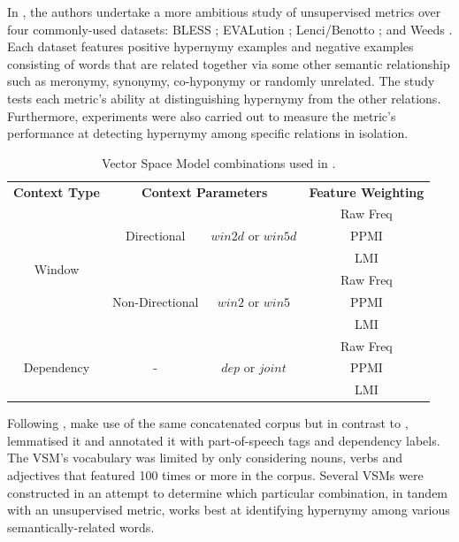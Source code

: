 In \citep{shwartz2017siege}, the authors undertake a more ambitious study of unsupervised metrics over four commonly-used datasets: BLESS \citep{Baroni2011}; EVALution \citep{santus2015evalution}; Lenci/Benotto \citep{benotto2015distributional}; and Weeds \citep{weeds2014learning}.  Each dataset features positive hypernymy examples and negative examples consisting of words that are related together via some other semantic relationship such as meronymy, synonymy, co-hyponymy or randomly unrelated.  The study tests each metric’s ability at distinguishing hypernymy from the other relations.  Furthermore, experiments were also carried out to measure the metric’s performance at detecting hypernymy among specific relations in isolation. 

\begin{table}\centering
    \begin{tabular}{@{}cccc@{}} \toprule
    \textbf{Context Type} & \multicolumn{2}{c}{\textbf{Context Parameters}} & \textbf{Feature Weighting} \\ \cmidrule{1-4}
    \multirow{6}{*}{Window} & 
    \multirow{3}{*}{Directional} &
    \multirow{3}{*}{$win2d$ or $win5d$} & Raw Freq \\
    & & & PPMI \\
    & & & LMI \\ 
    \cmidrule{2-4}
    & \multirow{3}{*}{Non-Directional} &
      \multirow{3}{*}{$win2$ or $win5$} & Raw Freq \\
    & & & PPMI \\
    & & & LMI \\ 
    \cmidrule{1-4}
    \multirow{3}{*}{Dependency} & 
    \multirow{3}{*}{-} &
    \multirow{3}{*}{$dep$ or $joint$} & Raw Freq \\
    & & & PPMI \\
    & & & LMI \\
    \bottomrule
    \end{tabular}
    \caption{Vector Space Model combinations used in \citep{shwartz2017siege}.}\label{tab:siege_vector_spaces}
\end{table}

Following \citep{santus2014chasing}, \citeauthor{shwartz2017siege} make use of the same concatenated corpus but in contrast to \citeauthor{santus2014chasing}, lemmatised it and annotated it with part-of-speech tags and dependency labels.  The \ac{VSM}’s vocabulary was limited by only considering nouns, verbs and adjectives that featured 100 times or more in the corpus.  Several \acl{VSM}s were constructed in an attempt to determine which particular combination, in tandem with an unsupervised metric, works best at identifying hypernymy among  %
various semantically-related words.

